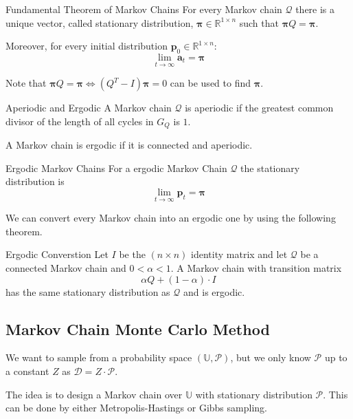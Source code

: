 \documentclass[english]{panikzettel}
\begin{document}
\begin{theo}{Fundamental Theorem of Markov Chains}
For every Markov chain $\mathcal{Q}$ there is a unique vector, called stationary distribution, $\boldsymbol{\pi} \in \mathbb{R}^{1 \times n}$ such that $\boldsymbol{\pi} Q = \boldsymbol{\pi}$.

Moreover, for every initial distribution $\textbf{p}_0 \in \mathbb{R}^{1 \times n}$:
$$
\lim_{t \rightarrow \infty} \textbf{a}_t = \boldsymbol{\pi}
$$
\end{theo}

Note that $\boldsymbol{\pi} Q = \boldsymbol{\pi} \Leftrightarrow (Q^T - I)\boldsymbol{\pi}=0$ can be used to find $\boldsymbol{\pi}$.


\begin{defi}{Aperiodic and Ergodic}
A Markov chain $\mathcal{Q}$ is aperiodic if the greatest common divisor of the length of all cycles in $G_Q$ is $1$.

A Markov chain is ergodic if it is connected and aperiodic.
\end{defi}

\begin{theo}{Ergodic Markov Chains}
For a ergodic Markov Chain $\mathcal{Q}$ the stationary distribution is
$$
\lim_{t \rightarrow \infty} \textbf{p}_t = \boldsymbol{\pi}
$$
\end{theo}

We can convert every Markov chain into an ergodic one by using the following theorem.

\begin{theo}{Ergodic Converstion}
Let $I$ be the $(n\times n)$ identity matrix and let $\mathcal{Q}$ be a connected Markov chain and $0 < \alpha < 1$. A Markov chain with transition matrix
\[
\alpha Q + (1 - \alpha)\cdot I
\]
has the same stationary distribution as $\mathcal{Q}$ and is ergodic.
\end{theo}

\subsection{Markov Chain Monte Carlo Method}
We want to sample from a probability space $(\mathbb{U}, \mathcal{P})$, but we only know $\mathcal{P}$ up to a constant $Z$ as $\mathcal{D} = Z \cdot \mathcal{P}$.

The idea is to design a Markov chain over $\mathbb{U}$ with stationary distribution $\mathcal{P}$. This can be done by either Metropolis-Hastings or Gibbs sampling.
\end{document}
